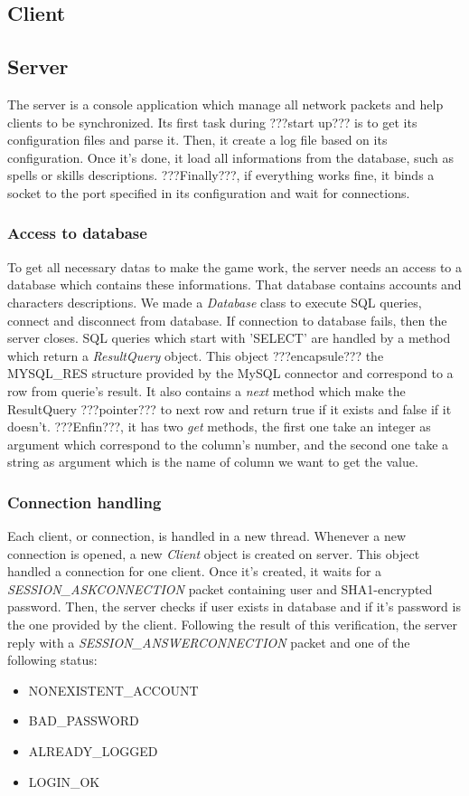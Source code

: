 \documentclass{scrreprt}
\begin{document}
		\subsection{Client}
		\subsection{Server}
		The server is a console application which manage all network packets and help clients to be synchronized. Its first task during ???start up??? is to  get its configuration files and parse it. Then, it create a log file based on its configuration. Once it's done, it load all informations from the database, such as spells or skills descriptions. ???Finally???, if everything works fine, it binds a socket to the port specified in its configuration and wait for connections.
		\subsubsection{Access to database}
		To get all necessary datas to make the game work, the server needs an access to a database which contains these informations. That database contains accounts and characters descriptions. We made a \emph{Database} class to execute SQL queries, connect and disconnect from database. If connection to database fails, then the server closes. SQL queries which start with 'SELECT' are handled by a method which return a \emph{ResultQuery} object. This object ???encapsule??? the MYSQL\_RES structure provided by the MySQL connector and correspond to a row from querie's result. It also contains a \emph{next} method which make the ResultQuery ???pointer??? to next row and return true if it exists and false if it doesn't. ???Enfin???, it has two \emph{get} methods, the first one take an integer as argument which correspond to the column's number, and the second one take a string as argument which is the name of column we want to get the value.
		\subsubsection{Connection handling}
		Each client, or connection, is handled in a new thread. Whenever a new connection is opened, a new \emph{Client} object is created on server. This object handled a connection for one client. Once it's created, it waits for a \emph{SESSION\_ASKCONNECTION} packet containing user and SHA1-encrypted password. Then, the server checks if user exists in database and if it's password is the one provided by the client. Following the result of this verification, the server reply with a \emph{SESSION\_ANSWERCONNECTION} packet and one of the following status:
		\begin{itemize}
		\item{NONEXISTENT\_ACCOUNT}
		\item{BAD\_PASSWORD}
		\item{ALREADY\_LOGGED}
		\item{LOGIN\_OK}
		\end{itemize}
\end{document}
